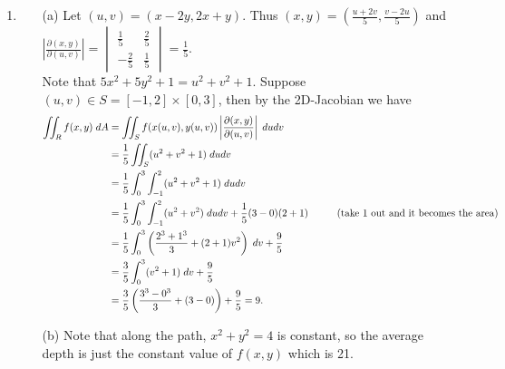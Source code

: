 \documentclass{article}
\begin{document}
\begin{enumerate}
    \newpage
    \item
    \begin{enumerate}
        \item[(a)] Let $(u, v) = (x-2y, 2x+y)$. Thus $(x,y)=\left(\frac{u+2v}{5}, \frac{v-2u}{5}\right)$ and $\left\vert\frac{\partial(x,y)}{\partial(u,v)}\right\vert=\begin{vmatrix}\frac{1}{5} & \frac{2}{5} \\ -\frac{2}{5} & \frac{1}{5}\end{vmatrix}=\frac15$.\\
        Note that $5x^2+5y^2+1=u^2+v^2+1$. Suppose $(u, v) \in S=[-1,2]\times[0,3]$, then by the 2D-Jacobian we have
        \begin{align*}
            \iint_R f(x,y) \hspace{1mm}dA &= \iint_S f(x(u,v), y(u, v))\left\vert\frac{\partial(x,y)}{\partial(u,v)}\right\vert \hspace{1mm}dudv\\
            &= \frac15\iint_S (u^2+v^2+1) \hspace{1mm}dudv\\
            &= \frac15\int_0^3\int_{-1}^2 (u^2+v^2+1) \hspace{1mm}dudv\\
            &= \frac15\int_0^3\int_{-1}^2 (u^2+v^2) \hspace{1mm}dudv + \frac15(3-0)(2+1) \hspace{1 cm} \text{(take 1 out and it becomes the area)}\\
            &= \frac15\int_0^3 \left(\frac{2^3+1^3}{3}+(2+1)v^2\right) \hspace{1mm}dv + \frac95\\
            &= \frac35\int_0^3 (v^2+1) \hspace{1mm}dv + \frac95\\
            &= \frac35\left(\frac{3^3-0^3}{3}+(3-0)\right)+ \frac95 = 9.
        \end{align*}
        
        \vspace{1cm}
        \item[(b)] Note that along the path, $x^2+y^2=4$ is constant, so the average depth is just the constant value of $f(x,y)$ which is 21.
        

\end{enumerate}
\end{enumerate}
\end{document}
